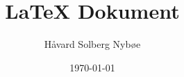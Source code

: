 \documentclass[a4paper, 12pt]{article}  %
\title{{\LaTeX} Dokument}               %
\author{Håvard Solberg Nybøe}           %
\date{\today}                           %
\begin{document}
\maketitle

\section{}

\end{document}
